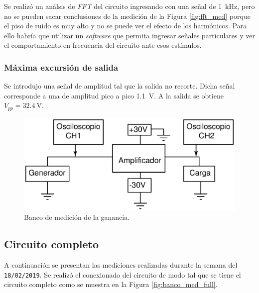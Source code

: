 			Se realizó un análsis de \emph{FFT} del circuito ingresando con una señal de \SI{1}{\kHz}, pero no se pueden sacar conclusiones de la medición de la Figura \ref{fig:fft_med} porque el piso de ruido es muy alto y no se puede ver el efecto de los harmónicos. Para ello habría que utilizar un \emph{software} que permita ingresar señales particulares y ver el comportamiento en frecuencia del circuito ante esos estímulos.


		\subsubsection{Máxima excursión de salida}
			
		Se introdujo una señal de amplitud tal que la salida no recorte. Dicha señal corresponde a una de amplitud pico a pico \SI{1.1}{\V}. A la salida se obtiene $V_{pp} = \SI{32.4}{\V}$.

		\begin{figure}[h!]
			\centering
			\includegraphics[scale=0.6]{./Figuras/bco_ganancia.eps}
			\caption{Banco de medición de la ganancia.}
			\label{fig:bco_ganancia}
		\end{figure}


		\subsection{Circuito completo}
		A continuación se presentan las mediciones realizadas durante la semana del \texttt{18/02/2019}. Se realizó el conexionado del circuito de modo tal que se tiene el circuito completo como se muestra en la Figura \ref{fig:banco_med_full}. 


